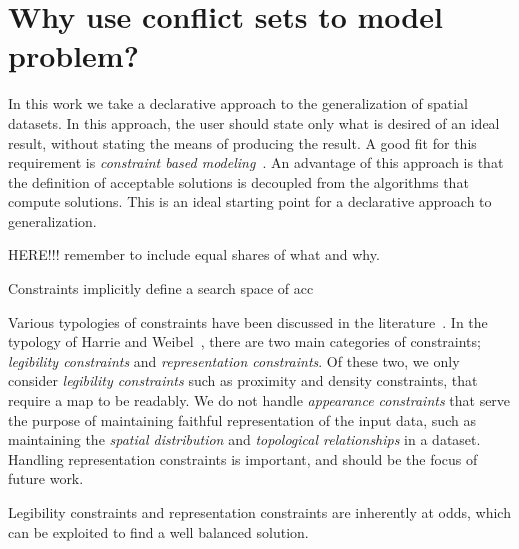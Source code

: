 \documentclass[11pt, oneside]{article}   	%
\begin{document}
\section{Why use conflict sets to model problem?}



In this work we take a declarative approach to the generalization of spatial datasets. In this approach, the user should state only what is desired of an ideal result, without stating the means of producing the result. A good fit for this requirement is \emph{constraint based modeling}~\cite{beard1991constraints,harrie1999constraint}. An advantage of this approach is that the definition of acceptable solutions is decoupled from the algorithms that compute solutions. This is an ideal starting point for a declarative approach to generalization.

HERE!!! remember to include equal shares of what and why.


Constraints implicitly define a search space of acc

Various typologies of constraints have been discussed in the literature~\cite{beard1991constraints,harrie2007modelling}. In the typology of Harrie and Weibel~\cite{harrie2007modelling}, there are two main categories of constraints; \emph{legibility constraints} and \emph{representation constraints}. Of these two, we only consider \emph{legibility constraints} such as proximity and density constraints, that require a map to be readably. We do not handle \emph{appearance constraints} that serve the purpose of maintaining faithful representation of the input data, such as maintaining the \emph{spatial distribution} and \emph{topological relationships} in a dataset. Handling representation constraints is important, and should be the focus of future work.

Legibility constraints and representation constraints are inherently at odds, which can be exploited to find a well balanced solution.
\end{document}
